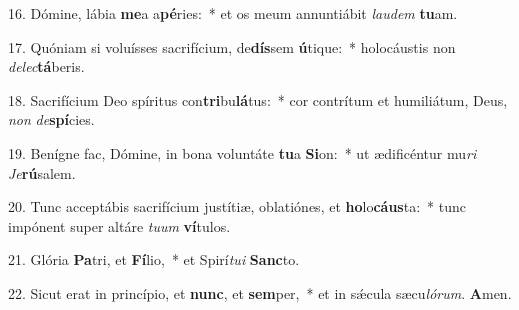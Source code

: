 16. Dómine, lábia \textbf{me}a a\textbf{pé}ries:~* et os meum annuntiábit \textit{lau}\textit{dem} \textbf{tu}am.

17. Quóniam si voluísses sacrifícium, de\textbf{dís}sem \textbf{ú}tique:~* holocáustis non \textit{de}\textit{lec}\textbf{tá}beris.

18. Sacrifícium Deo spíritus con\textbf{tri}bu\textbf{lá}tus:~* cor contrítum et humiliátum, Deus, \textit{non} \textit{de}\textbf{spí}cies.

19. Benígne fac, Dómine, in bona voluntáte \textbf{tu}a \textbf{Si}on:~* ut ædificéntur mu\textit{ri} \textit{Je}\textbf{rú}salem.

20. Tunc acceptábis sacrifícium justítiæ, oblatiónes, et \textbf{ho}lo\textbf{cáus}ta:~* tunc impónent super altáre \textit{tu}\textit{um} \textbf{ví}tulos.

21. Glória \textbf{Pa}tri, et \textbf{Fí}lio,~* et Spirí\textit{tu}\textit{i} \textbf{Sanc}to.

22. Sicut erat in princípio, et \textbf{nunc}, et \textbf{sem}per,~* et in s\'{\ae}cula sæcu\textit{ló}\textit{rum}. \textbf{A}men.